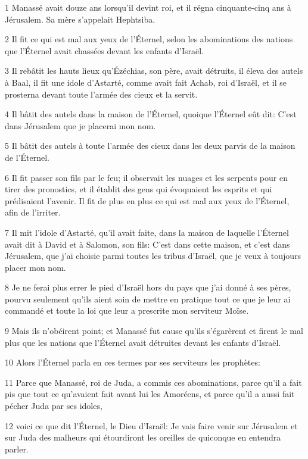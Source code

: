 \par 1 Manassé avait douze ans lorsqu'il devint roi, et il régna cinquante-cinq ans à Jérusalem. Sa mère s'appelait Hephtsiba.
\par 2 Il fit ce qui est mal aux yeux de l'Éternel, selon les abominations des nations que l'Éternel avait chassées devant les enfants d'Israël.
\par 3 Il rebâtit les hauts lieux qu'Ézéchias, son père, avait détruits, il éleva des autels à Baal, il fit une idole d'Astarté, comme avait fait Achab, roi d'Israël, et il se prosterna devant toute l'armée des cieux et la servit.
\par 4 Il bâtit des autels dans la maison de l'Éternel, quoique l'Éternel eût dit: C'est dans Jérusalem que je placerai mon nom.
\par 5 Il bâtit des autels à toute l'armée des cieux dans les deux parvis de la maison de l'Éternel.
\par 6 Il fit passer son fils par le feu; il observait les nuages et les serpents pour en tirer des pronostics, et il établit des gens qui évoquaient les esprits et qui prédisaient l'avenir. Il fit de plus en plus ce qui est mal aux yeux de l'Éternel, afin de l'irriter.
\par 7 Il mit l'idole d'Astarté, qu'il avait faite, dans la maison de laquelle l'Éternel avait dit à David et à Salomon, son fils: C'est dans cette maison, et c'est dans Jérusalem, que j'ai choisie parmi toutes les tribus d'Israël, que je veux à toujours placer mon nom.
\par 8 Je ne ferai plus errer le pied d'Israël hors du pays que j'ai donné à ses pères, pourvu seulement qu'ils aient soin de mettre en pratique tout ce que je leur ai commandé et toute la loi que leur a prescrite mon serviteur Moïse.
\par 9 Mais ils n'obéirent point; et Manassé fut cause qu'ils s'égarèrent et firent le mal plus que les nations que l'Éternel avait détruites devant les enfants d'Israël.
\par 10 Alors l'Éternel parla en ces termes par ses serviteurs les prophètes:
\par 11 Parce que Manassé, roi de Juda, a commis ces abominations, parce qu'il a fait pis que tout ce qu'avaient fait avant lui les Amoréens, et parce qu'il a aussi fait pécher Juda par ses idoles,
\par 12 voici ce que dit l'Éternel, le Dieu d'Israël: Je vais faire venir sur Jérusalem et sur Juda des malheurs qui étourdiront les oreilles de quiconque en entendra parler.
